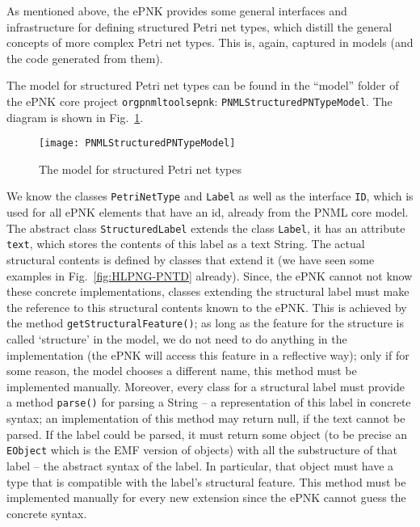 As mentioned above, the ePNK provides some general interfaces and infrastructure
for defining structured Petri net types, which distill the general concepts of
more complex Petri net types. This is, again, captured in models (and the
code generated from them).

The model for structured Petri net types can be found in the ``model''
folder of the ePNK core project {\tt org\qnsep{}pnml\qnsep{}tools\qnsep{}epnk}:
{\tt PNMLStructured\optsep{}PNTypeModel}.
The diagram is shown in Fig.~\ref{fig:PNMLStructuredType}.
%
\begin{figure}[hbt!!]
  \centerline{\texttt{[image: PNMLStructuredPNTypeModel]}}
  \caption{The model for structured Petri net types}
  \label{fig:PNMLStructuredType}
\end{figure}
%
We know the classes {\tt PetriNetType} and {\tt Label} as well as the
interface {\tt ID}, which is used for all ePNK elements that have an id,
already from the PNML core model. The abstract class {\tt StructuredLabel}%
extends the class {\tt Label}, it has an attribute {\tt text}, which stores
the contents of this label as a text String. The actual structural contents
is defined by classes that extend it (we have seen
some examples in Fig.~\ref{fig:HLPNG-PNTD} already). Since, the ePNK cannot
not know these concrete implementations, classes extending the structural
label must make the reference to this structural contents known to the
ePNK. This is achieved by the method {\tt getStructuralFeature()};%
as long as the feature for the structure is called `structure' in the model, we
do not need to do anything in the implementation (the ePNK will access this
feature in a reflective way); only if for some reason, the model chooses a
different name, this method must be implemented manually. Moreover, every class
for a structural label must provide a method {\tt parse()}%
for parsing a String
-- a representation of this label in concrete syntax; an implementation of this
method may return null, if the text cannot be parsed. If the label could be
parsed,  it must return some object (to be precise an {\tt EObject} which is the
EMF version of objects) with all the substructure of that label -- the abstract
syntax of the label. In particular, that object must have a type that is
compatible with the label's structural feature. This method must be implemented
manually for every new extension since the ePNK cannot guess the concrete syntax.

